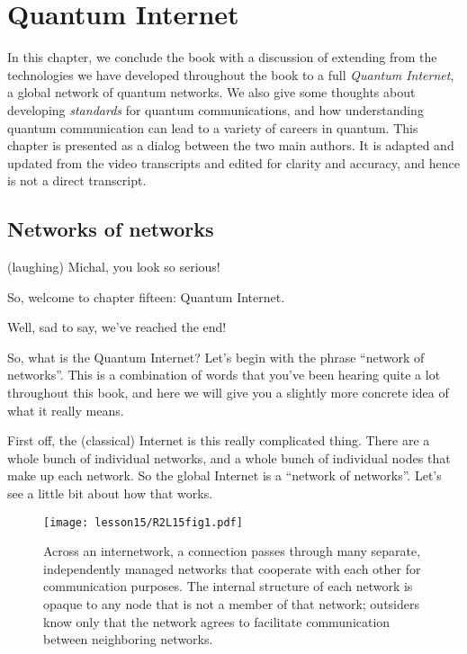 \chapter{Quantum Internet}

In this chapter, we conclude the book with a discussion of extending from the technologies we have developed throughout the book to a full \emph{Quantum Internet}, a global network of quantum networks. We also give some thoughts about developing \emph{standards} for quantum communications, and how understanding quantum communication can lead to a variety of careers in quantum. This chapter is presented as a dialog between the two main authors. It is adapted and updated from the video transcripts and edited for clarity and accuracy, and hence is not a direct transcript.

\section{Networks of networks}

\rrr (laughing) Michal, you look so serious!

So, welcome to chapter fifteen: Quantum Internet.


\mmm Well, sad to say, we've reached the end!

So, what is the Quantum Internet?
Let's begin with the phrase ``network of networks''.
This is a combination of words that you've been hearing quite a lot throughout this book, and here we will give you a slightly more concrete idea of what it really means.

\rrr First off, the (classical) Internet is this really complicated thing. There are a whole bunch of individual networks, and a whole bunch of individual nodes that make up each network. So the global Internet is a ``network of networks''. Let's see a little bit about how that works.

\begin{figure}[t]
    \centering
    \texttt{[image: lesson15/R2L15fig1.pdf]}
    \caption[Network of Networks]{Across an internetwork, a connection passes through many separate, independently managed networks that cooperate with each other for communication purposes.  The internal structure of each network is opaque to any node that is not a member of that network; outsiders know only that the network agrees to facilitate communication between neighboring networks.}
    \label{fig:15-1-NofN}
\end{figure}


